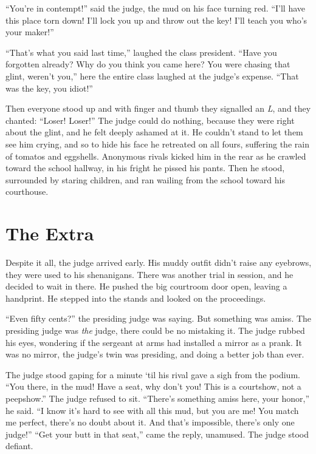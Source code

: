 \documentclass[oneside]{book}
\begin{document}
``You're in contempt!'' said the judge, the mud on his face turning red.  ``I'll have this
place torn down!  I'll lock you up and throw out the key!  I'll teach you who's your
maker!''

``That's what you said last time,'' laughed the class president.  ``Have you forgotten already?
Why do you think you came here?  You were chasing that glint, weren't you,'' here the entire
class laughed at the judge's expense.  ``That was the key, you idiot!''

Then everyone stood up and with finger and thumb they signalled an \emph{L}, and they chanted:
``Loser!  Loser!''  The judge could do nothing, because they were right about the glint, and he
felt deeply ashamed at it.  He couldn't stand to let them see him crying, and so to hide his
face he retreated on all fours, suffering the rain of tomatos and eggshells.  Anonymous rivals kicked
him in the rear as he crawled toward the school hallway, in his fright he pissed his pants.
Then he stood, surrounded by staring children, and ran wailing from the school toward his
courthouse.


\chapter{The Extra}


Despite it all, the judge arrived early.  His muddy outfit didn't raise any eyebrows,
they were used to his shenanigans.  There was another trial in session, and he decided to wait in there.
He pushed the big courtroom door open, leaving a handprint.  He stepped into the stands and
looked on the proceedings.

``Even fifty cents?'' the presiding judge was saying.  But something was amiss.
The presiding judge was \emph{the} judge, there could be no mistaking it.  The judge rubbed his
eyes, wondering if the sergeant at arms had installed a mirror as a prank.
It was no mirror, the judge's twin was presiding, and doing a better job
than ever.

The judge stood gaping for a minute `til his rival gave a sigh from the podium.
``You there, in the mud!  Have a seat, why don't you!  This is a courtshow, not a peepshow.''
The judge refused to sit.  ``There's something amiss here, your honor,'' he said.  ``I know it's
hard to see with all this mud, but you are me!  You match me perfect, there's no doubt about it.
And that's impossible, there's only one judge!''  ``Get your butt in that seat,''
came the reply, unamused.  The judge stood defiant.
\end{document}
